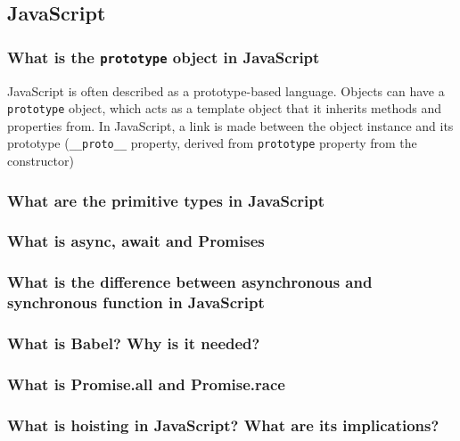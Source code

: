 \documentclass[12pt, a4paper]{article}
\newcommand{\code}[1]{\texttt{#1}}
\begin{document}
\noindent

\tableofcontents

\pagebreak

\subsection*{JavaScript}
\subsubsection*{What is the \code{prototype} object in JavaScript}
JavaScript is often described as a prototype-based language.
Objects can have a \code{prototype} object, which acts as a template object that it inherits methods and properties from.
In JavaScript, a link is made between the object instance and its prototype (\code{\_\_proto\_\_} property, derived from \code{prototype} property from the constructor)

\subsubsection*{What are the primitive types in JavaScript}

\subsubsection*{What is async, await and Promises}

\subsubsection*{What is the difference between asynchronous and synchronous function in JavaScript}

\subsubsection*{What is Babel? Why is it needed?}

\subsubsection*{What is Promise.all and Promise.race}

\subsubsection*{What is hoisting in JavaScript? What are its implications? }
\end{document}
